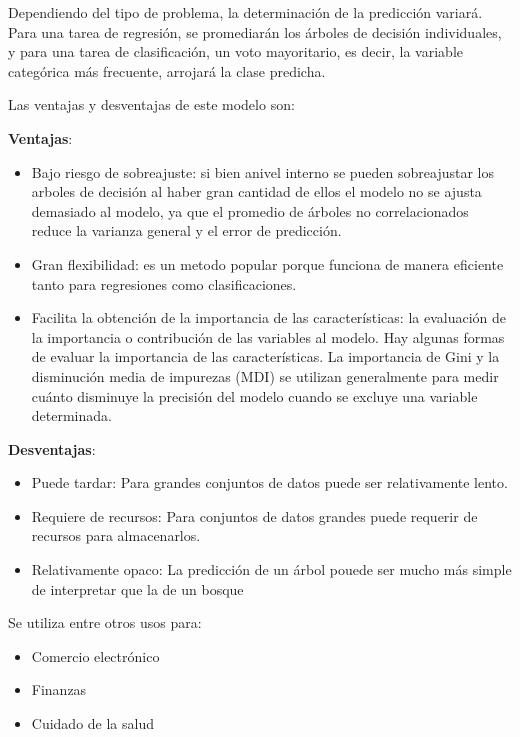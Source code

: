 Dependiendo del tipo de problema, la determinación de la predicción variará. Para una tarea de regresión, se promediarán los árboles de decisión individuales, y para una tarea de clasificación, un voto mayoritario, es decir, la variable categórica más frecuente, arrojará la clase predicha.

Las ventajas y desventajas de este modelo son:

\textbf{Ventajas}:

\begin{itemize}
	\item{Bajo riesgo de sobreajuste}: si bien anivel interno se pueden sobreajustar los arboles de decisión al haber gran cantidad de ellos el modelo no se ajusta demasiado al modelo, ya que el promedio de árboles no correlacionados reduce la varianza general y el error de predicción.
	
	\item{Gran flexibilidad}: es un metodo popular porque funciona de manera eficiente tanto para regresiones como clasificaciones.
	
	\item{Facilita la obtención de la importancia de las características}: la evaluación de la importancia o contribución de las variables al modelo. Hay algunas formas de evaluar la importancia de las características. La importancia de Gini y la disminución media de impurezas (MDI) se utilizan generalmente para medir cuánto disminuye la precisión del modelo cuando se excluye una variable determinada.
	
\end{itemize}

\textbf{Desventajas}:

\begin{itemize}
	\item{Puede tardar}: Para grandes conjuntos de datos puede ser relativamente lento.
	
	\item{Requiere de recursos}: Para conjuntos de datos grandes puede requerir de recursos para almacenarlos.
	
	\item{Relativamente opaco}: La predicción de un árbol pouede ser mucho más simple de interpretar que la de un bosque
	
\end{itemize}

Se utiliza entre otros usos para:

\begin{itemize}
	\item{Comercio electrónico}
	
	\item{Finanzas}
	
	\item{Cuidado de la salud}
	
\end{itemize}

